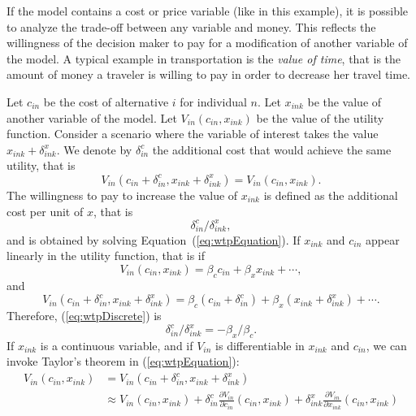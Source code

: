 \documentclass[12pt,a4paper]{article}
\newcommand{\req}[1]{(\ref{#1})}
\begin{document}
If the model contains a cost or price variable (like in this example),
it is possible to analyze the trade-off between any variable and money. 
This reflects the willingness of the decision maker to pay for a modification of another variable of the model.
A typical example in transportation is the \emph{value of time}, that
is the amount of money a traveler is willing to pay in order to
decrease her travel time.

Let $c_{in}$ be the cost of alternative $i$ for individual $n$.
Let $x_{ink}$ be the value of another variable of the model. 
Let $V_{in}(c_{in},x_{ink})$ be the value of the utility function. 
Consider a scenario where the variable of interest takes the value
$x_{ink} + \delta^x_{ink}$. 
We denote by $\delta^c_{in}$ the additional  cost  that would achieve the same utility, that is
\begin{equation}
  \label{eq:wtpEquation}
V_{in}(c_{in}+\delta^c_{in},x_{ink}+\delta^x_{ink}) = V_{in}(c_{in},x_{ink}).
\end{equation}
The willingness to pay to increase the value of $x_{ink}$ is defined
as the additional cost per unit of $x$, that is 
\begin{equation}
  \label{eq:wtpDiscrete}
  \delta^c_{in}/\delta^x_{ink},
\end{equation}
and is obtained by solving Equation~\req{eq:wtpEquation}.
If $x_{ink}$ and $c_{in}$ appear linearly in the utility function, that
is if
\begin{equation}
V_{in}(c_{in},x_{ink}) = \beta_c c_{in} + \beta_x x_{ink} + \cdots,
\end{equation}
and
\begin{equation}
V_{in}(c_{in}+\delta^c_{in},x_{ink}+\delta^x_{ink}) = \beta_c (c_{in}+\delta^c_{in}) + \beta_x (x_{ink}+\delta^x_{ink}) + \cdots.
\end{equation}
Therefore, \req{eq:wtpDiscrete} is
\begin{equation}
  \label{eq:wtpLinear}
  \delta^c_{in}/\delta^x_{ink} = -\beta_x / \beta_c.
\end{equation}
If $x_{ink}$ is a continuous variable, and if $V_{in}$ is
differentiable in $x_{ink}$ and $c_{in}$, we can invoke  Taylor's
theorem in \req{eq:wtpEquation}:
\begin{equation}
\begin{aligned}
V_{in}(c_{in},x_{ink})&= V_{in}(c_{in}+\delta^c_{in},x_{ink}+\delta^x_{ink})\\ &\approx V_{in}(c_{in},x_{ink}) + \delta^c_{in} \frac{\partial V_{in}}{\partial c_{in}}(c_{in},x_{ink})+ \delta^x_{ink} \frac{\partial V_{in}}{\partial x_{ink}}(c_{in},x_{ink})
\end{aligned}
\end{equation}
\end{document}
